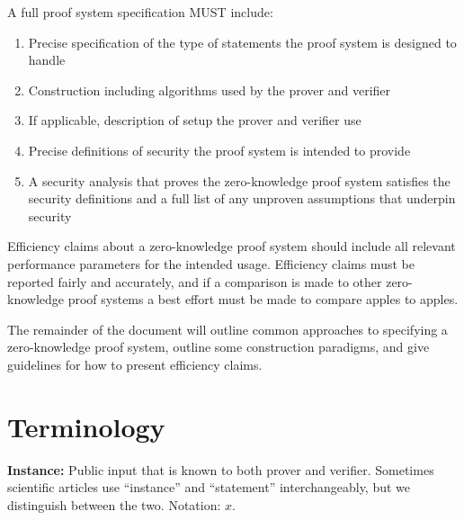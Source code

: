 A full proof system specification MUST include:
\begin{enumerate}
\item Precise specification of the type of statements the proof system is designed to handle
\item Construction including algorithms used by the prover and verifier
\item If applicable, description of setup the prover and verifier use
\item Precise definitions of security the proof system is intended to provide
\item A security analysis that proves the zero-knowledge proof system satisfies the security definitions and a full list of any unproven assumptions that underpin security
\end{enumerate}

Efficiency claims about a zero-knowledge proof system should include all relevant performance parameters for the intended usage.
Efficiency claims must be reported fairly and accurately, and if a comparison is made to other zero-knowledge proof systems a best effort must be made to compare apples to apples.

The remainder of the document will outline common approaches to specifying 
a %
zero-knowledge proof system, outline some construction paradigms, and give guidelines for how to present efficiency claims.
\loosen


\section{Terminology}
\label{security:terminology}


{\bfseries \hypertarget{def:instance}{Instance}:} Public input 
that is known to both prover and verifier.
Sometimes scientific articles use “instance” and “statement” interchangeably, but we %
distinguish between the two. 
Notation: $x$.
\loosen
 

